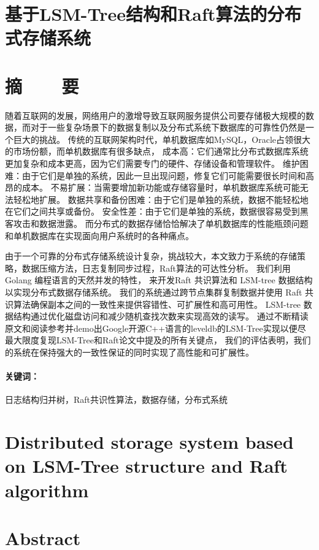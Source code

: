 \section*{基于LSM-Tree结构和Raft算法的分布式存储系统}
\section*{摘\ \ \ \ 要}

随着互联网的发展，网络用户的激增导致互联网服务提供公司要存储极大规模的数据，而对于一些复杂场景下的数据复制以及分布式系统下数据库的可靠性仍然是一个巨大的挑战。
传统的互联网架构时代，单机数据库如MySQL，Oracle占领很大的市场份额，而单机数据库有很多缺点，
成本高：它们通常比分布式数据库系统更加复杂和成本更高，因为它们需要专门的硬件、存储设备和管理软件。
维护困难：由于它们是单独的系统，因此一旦出现问题，修复它们可能需要很长时间和高昂的成本。
不易扩展：当需要增加新功能或存储容量时，单机数据库系统可能无法轻松地扩展。
数据共享和备份困难：由于它们是单独的系统，数据不能轻松地在它们之间共享或备份。
安全性差：由于它们是单独的系统，数据很容易受到黑客攻击和数据泄露。
而分布式的数据存储恰恰解决了单机数据库的性能瓶颈问题和单机数据库在实现面向用户系统时的各种痛点。


由于一个可靠的分布式存储系统设计复杂，挑战较大，本文致力于系统的存储策略，数据压缩方法，日志复制同步过程，Raft算法的可达性分析。
我们利用 Golang 编程语言的天然并发的特性， 来开发Raft 共识算法和 LSM-tree 数据结构以实现分布式数据存储系统。 
我们的系统通过跨节点集群复制数据并使用 Raft 共识算法确保副本之间的一致性来提供容错性、可扩展性和高可用性。 LSM-tree 数据结构通过优化磁盘访问和减少随机查找次数来实现高效的读写。 
通过不断精读原文和阅读参考并demo出Google开源C++语言的leveldb的LSM-Tree实现以便尽最大限度复现LSM-Tree和Raft论文中提及的所有关键点，
我们的评估表明，我们的系统在保持强大的一致性保证的同时实现了高性能和可扩展性。

\paragraph{关键词：} 日志结构归并树，Raft共识性算法，数据存储，分布式系统

\clearpage


\section*{Distributed storage system based on LSM-Tree structure and Raft algorithm}

\section*{Abstract}

